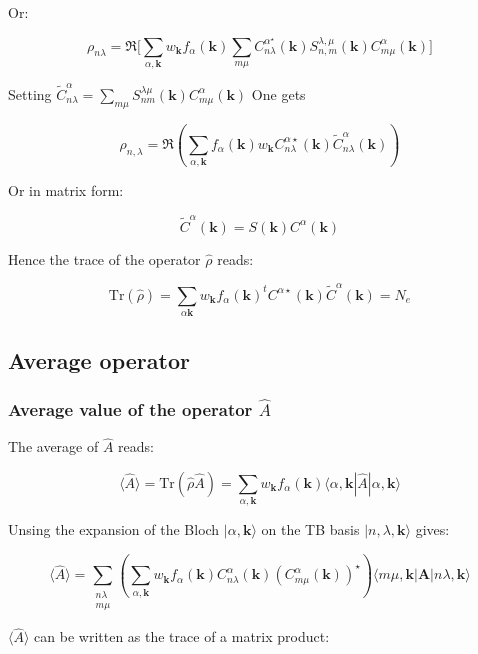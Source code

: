 \documentclass{article}
\newcommand{\bra}[1]{\langle #1|}
\newcommand{\ket}[1]{|#1\rangle}
\newcommand{\op}[1]{\hat{#1}}
\begin{document}
\noindent Or:

\[\rho_{n \lambda}=\Re \Bigg[\sum_{\alpha,\mathbf{k}}
w_{\mathbf{k}} f_{\alpha}(\mathbf{k}) \sum_{m
\mu} C_{n \lambda}^{\alpha
^{\star}}(\mathbf{k})S_{n,m}^{\lambda,\mu}(\mathbf{k})C_{m
\mu}^{\alpha}(\mathbf{k})\Bigg]\]


\noindent
Setting $\displaystyle \widetilde{C}_{n\lambda}^{\alpha}=\sum_{m \mu} 
S_{nm}^{\lambda \mu}(\mathbf{k}) C_{m \mu}^{\alpha}(\mathbf{k})$
\noindent
One gets

\[\displaystyle \rho_{n,\lambda}= \Re \left(
\sum_{\alpha,\mathbf{k}} f_{\alpha}(\mathbf{k})w_{\mathbf{k}}
C_{n \lambda}^{\alpha \star}(\mathbf{k})\widetilde{C}_{n\lambda}^{\alpha }(\mathbf{k})
 \right)\]

\noindent
Or in matrix form:

\[ 
\widetilde{C}^{\alpha}(\mathbf{k})=S(\mathbf{k})C^{\alpha}(\mathbf{k}) 
\]

\noindent
Hence the trace of the operator $\op{\rho}$ reads:

\[ \mbox{Tr} (\op{\rho })= 
\sum_{\alpha \mathbf{k}} w_{\mathbf{k}}
f_{\alpha}(\mathbf{k}) ^tC^{\alpha
\star}(\mathbf{k})\widetilde{C}^{\alpha}(\mathbf{k}) =N_e\]


\subsection{Average operator}


\subsubsection{Average value of the operator $\op{A}$}


\noindent The average of $\op{ A}$ reads:

\[ \langle \op{A} \rangle =\mbox{Tr} (\op{\rho} \op{A})=\sum_{\alpha,\mathbf{k}}
w_{\mathbf{k}}f_{\alpha}(\mathbf{k}) \bra{\alpha,\mathbf{k}}\op{A}\ket{\alpha,\mathbf{k}} \]

\noindent
Unsing the expansion of the Bloch $\ket{\alpha,\mathbf{k}}$ on the TB basis $\ket{n,\lambda,\mathbf{k}}$ gives:


\[ \displaystyle  \langle \op{A}\rangle=  \sum_{\substack{n \lambda \\ m \mu}} 
\left( \sum_{\alpha,\mathbf{k}} w_{\mathbf{k}} f_{\alpha}(\mathbf{k}) 
C_{n \lambda}^{\alpha}(\mathbf{k})(C_{m \mu}^{\alpha}(\mathbf{k}))^{\star} \right)   
\bra{ m \mu,\mathbf{k}}{\bm A} \ket{n \lambda,\mathbf{k}} \]


\noindent
$\langle \op{A} \rangle$ can be written as the trace of a matrix product:
\end{document}
